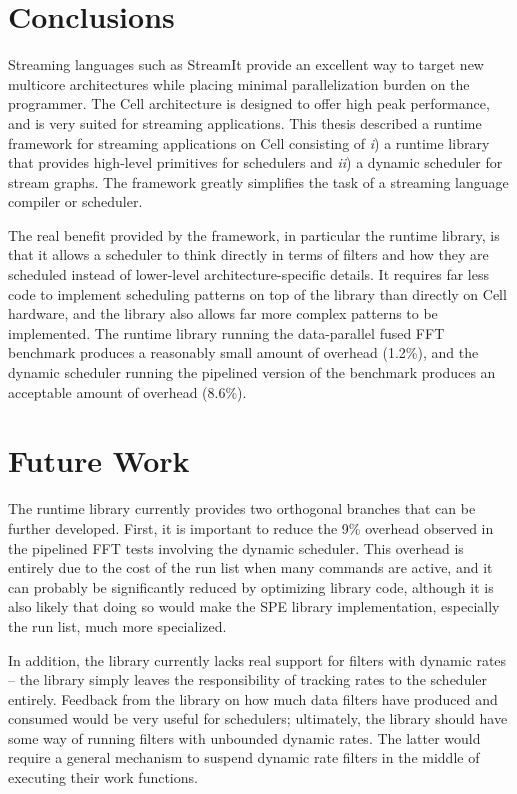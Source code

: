 \section{Conclusions}\label{ch:conc}

Streaming languages such as StreamIt provide an excellent way to target new multicore architectures while placing minimal parallelization burden on the programmer. The Cell architecture is designed to offer high peak performance, and is very suited for streaming applications. This thesis described a runtime framework for streaming applications on Cell consisting of \emph{i}) a runtime library that provides high-level primitives for schedulers and \emph{ii}) a dynamic scheduler for stream graphs. The framework greatly simplifies the task of a streaming language compiler or scheduler.

The real benefit provided by the framework, in particular the runtime library, is that it allows a scheduler to think directly in terms of filters and how they are scheduled instead of lower-level architecture-specific details. It requires far less code to implement scheduling patterns on top of the library than directly on Cell hardware, and the library also allows far more complex patterns to be implemented. The runtime library running the data-parallel fused FFT benchmark produces a reasonably small amount of overhead (1.2\%), and the dynamic scheduler running the pipelined version of the benchmark produces an acceptable amount of overhead (8.6\%).

\section{Future Work}

The runtime library currently provides two orthogonal branches that can be further developed. First, it is important to reduce the 9\% overhead observed in the pipelined FFT tests involving the dynamic scheduler. This overhead is entirely due to the cost of the run list when many commands are active, and it can probably be significantly reduced by optimizing library code, although it is also likely that doing so would make the SPE library implementation, especially the run list, much more specialized.

In addition, the library currently lacks real support for filters with dynamic rates -- the library simply leaves the responsibility of tracking rates to the scheduler entirely. Feedback from the library on how much data filters have produced and consumed would be very useful for schedulers; ultimately, the library should have some way of running filters with unbounded dynamic rates. The latter would require a general mechanism to suspend dynamic rate filters in the middle of executing their work functions.

